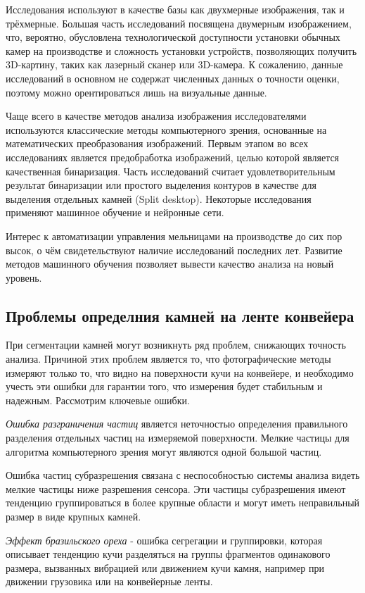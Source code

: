 \documentclass[specification,annotation,times]{itmo-student-thesis}
\begin{document}
Исследования используют в качестве базы как двухмерные изображения, так и трёхмерные. Большая часть исследований посвящена двумерным изображением, что, вероятно, обусловлена технологической доступности установки обычных камер на производстве и сложность установки устройств, позволяющих получить 3D-картину, таких как лазерный сканер или 3D-камера. К сожалению, данные исследований в основном не содержат численных данных о точности оценки, поэтому можно орентироваться лишь на визуальные данные.

Чаще всего в качестве методов анализа изображения исследователями используются классические методы компьютерного зрения, основанные на математических преобразования изображений. Первым этапом во всех исследованиях является предобработка изображений, целью которой является качественная бинаризация. Часть исследований считает удовлетворительным результат бинаризации или простого выделения контуров в качестве для выделения отдельных камней (Split desktop). Некоторые исследования применяют машинное обучение и нейронные сети.

Интерес к автоматизации управления мельницами на производстве до сих пор высок, о чём свидетельствуют наличие исследований последних лет. Развитие методов машинного обучения позволяет вывести качество анализа на новый уровень. 


\subsection{Проблемы определния камней на ленте конвейера}

При сегментации камней могут возникнуть ряд проблем, снижающих точность анализа. Причиной этих проблем является то, что фотографические методы измеряют только то, что видно на поверхности кучи на конвейере, и необходимо учесть эти ошибки для гарантии того, что измерения будет стабильным и надежным. Рассмотрим ключевые ошибки.

\textit{Ошибка разграничения частиц} является неточностью определения правильного разделения отдельных частиц на измеряемой поверхности. Мелкие частицы для алгоритма компьютерного зрения могут являются одной большой частиц. 

Ошибка частиц субразрешения связана с неспособностью системы анализа видеть мелкие частицы ниже разрешения сенсора. Эти частицы субразрешения имеют тенденцию группироваться в более крупные области и могут иметь неправильный размер в виде крупных камней.

\textit{Эффект бразильского ореха} - ошибка сегрегации и группировки, которая описывает тенденцию кучи разделяться на группы фрагментов одинакового размера, вызванных вибрацией или движением кучи камня, например при движении грузовика или на конвейерные ленты.
\end{document}
